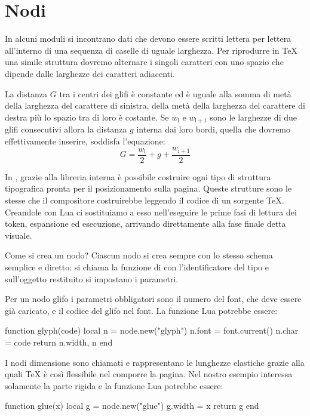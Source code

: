 

\chapter{Nodi}

In alcuni moduli si incontrano dati che devono essere scritti lettera per
lettera all'interno di una sequenza di caselle di uguale larghezza. Per
riprodurre in \TeX{} una simile struttura dovremo alternare i singoli caratteri
con uno spazio che dipende dalle larghezze dei caratteri adiacenti.

La distanza \( G \) tra i centri dei glifi è constante ed è uguale alla somma di
metà della larghezza del carattere di sinistra, della metà della larghezza del
carattere di destra più lo spazio tra di loro è costante. Se \(w_\mathrm{i} \) e
\(w_\mathrm{i+1} \) sono le larghezze di due glifi consecutivi allora la
distanza \( g \) interna dai loro bordi, quella che dovremo effettivamente
inserire, soddisfa l'equazione:
\[
    G = \frac{w_\mathrm{i}}{2} + g + \frac{w_\mathrm{i+1}}{2}
\]

In \LuaTeX, grazie alla libreria interna  è possibile costruire ogni
tipo di struttura tipografica pronta per il posizionamento sulla pagina. Queste
strutture sono le stesse che il compositore costruirebbe leggendo il codice di
un sorgente \TeX{}. Creandole con Lua ci sostituiamo a esso nell'eseguire le
prime fasi di lettura dei token, espansione ed esecuzione, arrivando
direttamente alla fase finale detta visuale.

Come si crea un nodo? Ciascun nodo si crea sempre con lo stesso schema semplice
e diretto: si chiama la funzione  di  con l'identificatore
del tipo e sull'oggetto restituito si impostano i parametri.

Per un nodo glifo i parametri obbligatori sono il numero del font, che deve
essere già caricato, e il codice del glifo nel font. La funzione Lua potrebbe
essere:
\begin{lines}
function glyph(code)
    local n = node.new("glyph")
    n.font = font.current()
    n.char = code
    return n.width, n
end
\end{lines}

I nodi dimensione sono chiamati  e rappresentano le lunghezze
elastiche grazie alla quali \TeX{} è così flessibile nel comporre la pagina. Nel
nostro esempio interessa solamente la parte rigida e la funzione Lua potrebbe
essere:
\begin{lines}
function glue(x)
    local g = node.new("glue")
    g.width = x
    return g
end
\end{lines}

